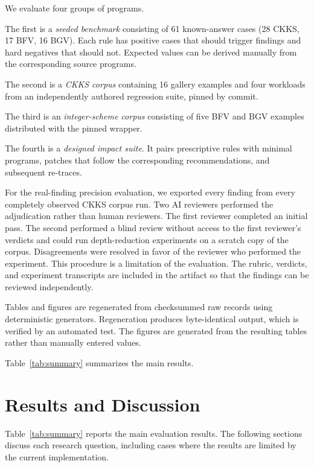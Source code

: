 \documentclass[pdflatex,sn-basic,Numbered,iicol]{sn-jnl}
\begin{document}
We evaluate four groups of programs.

The first is a \emph{seeded benchmark} consisting of 61 known-answer cases
(28 CKKS, 17 BFV, 16 BGV). Each rule has positive cases that should trigger
findings and hard negatives that should not. Expected values can be derived
manually from the corresponding source programs.

The second is a \emph{CKKS corpus} containing 16 gallery examples and four
workloads from an independently authored regression suite, pinned by commit.

The third is an \emph{integer-scheme corpus} consisting of five BFV and BGV
examples distributed with the pinned wrapper.

The fourth is a \emph{designed impact suite}. It pairs prescriptive rules with
minimal programs, patches that follow the corresponding recommendations, and
subsequent re-traces.

For the real-finding precision evaluation, we exported every finding from
every completely observed CKKS corpus run. Two AI reviewers performed the
adjudication rather than human reviewers. The first reviewer completed an
initial pass. The second performed a blind review without access to the first
reviewer's verdicts and could run depth-reduction experiments on a scratch
copy of the corpus. Disagreements were resolved in favor of the reviewer who
performed the experiment. This procedure is a limitation of the evaluation.
The rubric, verdicts, and experiment transcripts are included in the artifact
so that the findings can be reviewed independently.

Tables and figures are regenerated from checksummed raw records using
deterministic generators. Regeneration produces byte-identical output, which
is verified by an automated test. The figures are generated from the
resulting tables rather than manually entered values.

Table~\ref{tab:summary} summarizes the main results.

\section{Results and Discussion}
\label{sec:results}

Table~\ref{tab:summary} reports the main evaluation results. The following
sections discuss each research question, including cases where the results
are limited by the current implementation.
\end{document}
